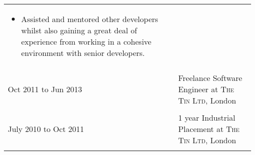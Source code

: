 \documentclass[a4paper,10pt]{article} %
\begin{document}
\begin{tabular}{ L{2cm} | L{11cm}}
\begin{itemize}[leftmargin=*]
		\item Assisted and mentored other developers whilst also gaining a great deal of experience from working in a cohesive environment with senior developers. 
	\end{itemize} \\
   
    
 \\



Oct 2011 to Jun 2013 & Freelance Software Engineer at \textsc{The Tin Ltd}, London \\

 \\





July 2010 to Oct 2011 & 1 year Industrial Placement at \textsc{The Tin Ltd}, London \\


 \\

\end{tabular}
\end{document}
